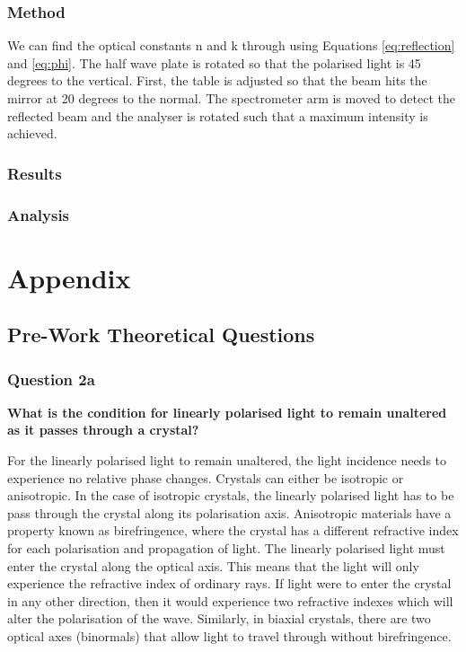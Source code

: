 \documentclass{article}
\begin{document}
\subsubsection{Method}
We can find the optical constants n and k through using Equations 
\ref{eq:reflection} and \ref{eq:phi}. The half wave plate is rotated 
so that the polarised light is 45 degrees to the vertical. First, the 
table is adjusted so that the beam hits the mirror at 20 degrees to 
the normal. The spectrometer arm is moved to detect the reflected beam 
and the analyser is rotated such that a maximum intensity is achieved.

\subsubsection{Results}
\subsubsection{Analysis}
\newpage
\section{Appendix}
\subsection{Pre-Work Theoretical Questions}
\subsubsection{Question 2a}
\textbf{What is the condition for linearly polarised light to 
remain unaltered as it passes through a crystal?}

For the linearly polarised light to remain unaltered, the light 
incidence needs to experience no relative phase changes. Crystals
can either be isotropic or anisotropic. In the case of isotropic 
crystals, the linearly polarised light has to be pass through the 
crystal along its polarisation axis. Anisotropic materials have a 
property known as birefringence, where the crystal has a different
refractive index for each polarisation and propagation of light. 
The linearly polarised light must enter the crystal along the 
optical axis. This means that the light will only experience the
refractive index of ordinary rays. If light were to enter the crystal
in any other direction, then it would experience two refractive indexes
which will alter the polarisation of the wave. Similarly, in biaxial
crystals, there are two optical axes (binormals) that allow light to
travel through without birefringence.
\end{document}
